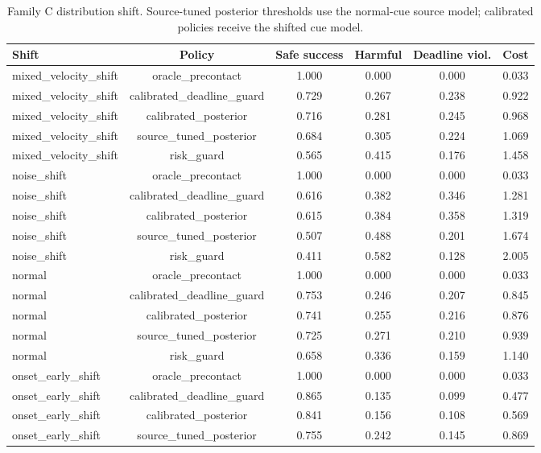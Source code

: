 \begin{table}[t]
\centering
\small
\caption{Family C distribution shift. Source-tuned posterior thresholds use the normal-cue source model; calibrated policies receive the shifted cue model.}
\label{tab:shift}
\begin{tabular}{lccccc}
\toprule
Shift & Policy & Safe success & Harmful & Deadline viol. & Cost \\
\midrule
mixed\_velocity\_shift & oracle\_precontact & 1.000 & 0.000 & 0.000 & 0.033 \\
mixed\_velocity\_shift & calibrated\_deadline\_guard & 0.729 & 0.267 & 0.238 & 0.922 \\
mixed\_velocity\_shift & calibrated\_posterior & 0.716 & 0.281 & 0.245 & 0.968 \\
mixed\_velocity\_shift & source\_tuned\_posterior & 0.684 & 0.305 & 0.224 & 1.069 \\
mixed\_velocity\_shift & risk\_guard & 0.565 & 0.415 & 0.176 & 1.458 \\
noise\_shift & oracle\_precontact & 1.000 & 0.000 & 0.000 & 0.033 \\
noise\_shift & calibrated\_deadline\_guard & 0.616 & 0.382 & 0.346 & 1.281 \\
noise\_shift & calibrated\_posterior & 0.615 & 0.384 & 0.358 & 1.319 \\
noise\_shift & source\_tuned\_posterior & 0.507 & 0.488 & 0.201 & 1.674 \\
noise\_shift & risk\_guard & 0.411 & 0.582 & 0.128 & 2.005 \\
normal & oracle\_precontact & 1.000 & 0.000 & 0.000 & 0.033 \\
normal & calibrated\_deadline\_guard & 0.753 & 0.246 & 0.207 & 0.845 \\
normal & calibrated\_posterior & 0.741 & 0.255 & 0.216 & 0.876 \\
normal & source\_tuned\_posterior & 0.725 & 0.271 & 0.210 & 0.939 \\
normal & risk\_guard & 0.658 & 0.336 & 0.159 & 1.140 \\
onset\_early\_shift & oracle\_precontact & 1.000 & 0.000 & 0.000 & 0.033 \\
onset\_early\_shift & calibrated\_deadline\_guard & 0.865 & 0.135 & 0.099 & 0.477 \\
onset\_early\_shift & calibrated\_posterior & 0.841 & 0.156 & 0.108 & 0.569 \\
onset\_early\_shift & source\_tuned\_posterior & 0.755 & 0.242 & 0.145 & 0.869 \\

\end{tabular}
\end{table}
